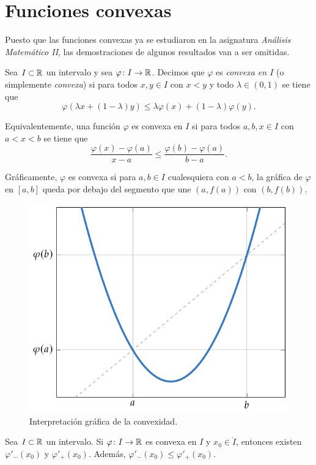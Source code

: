 \documentclass[a4paper, 11pt, oneside]{report}
\begin{document}
\section{Funciones convexas}

Puesto que las funciones convexas ya se estudiaron en la asignatura \emph{Análisis Matemático II}, las demostraciones de algunos resultados van a ser omitidas.

\begin{definition}
  Sea $I \subset \mathbb R$ un intervalo y sea $\varphi \colon I \to \mathbb R$. Decimos que $\varphi$ es \emph{convexa en $I$} (o simplemente \emph{convexa}) si para todos $x,y\in I$ con $x<y$ y todo $\lambda \in (0,1)$ se tiene que
  \[\varphi(\lambda x + (1-\lambda)y) \leq \lambda \varphi(x)+(1-\lambda) \varphi(y).\]
\end{definition}

Equivalentemente, una función $\varphi$ es convexa en $I$ si para todos $a,b,x \in I$ con $a<x<b$ se tiene que 
\[\frac{\varphi(x)-\varphi(a)}{x-a} \leq \frac{\varphi(b)-\varphi(a)}{b-a}.\]

Gráficamente, $\varphi$ es convexa si para $a,b \in I$ cualesquiera con $a<b$, la gráfica de $\varphi$ en $[a,b]$ queda por debajo del segmento que une $(a,f(a))$ con $(b,f(b))$.

\begin{figure}[H]
  \centering
  \includegraphics{./plot1/main.pdf}
  \caption{Interpretación gráfica de la convexidad.}
\end{figure}

\begin{proposition}
  Sea $I \subset \mathbb R$ un intervalo. Si $\varphi \colon I \to \mathbb R$ es convexa en $I$ y $x_0 \in \mathring{I}$, entonces existen $\varphi'_-(x_0)$ y $\varphi'_+(x_0)$. Además, $\varphi'_-(x_0) \leq \varphi'_+(x_0)$.
\end{proposition}
\end{document}
